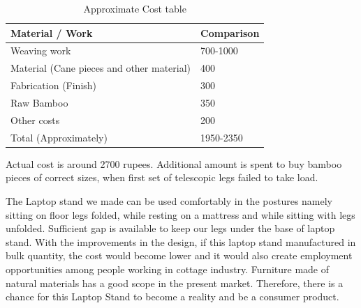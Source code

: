 \begin{table}[h!]
  \centering
  \caption{Approximate Cost table}
  \label{tab:table6}
  \begin{tabular}{l||l}
  	\hline
  	Material / Work & Comparison\\
    \hline    
	
Weaving work&
700-1000\\
Material (Cane pieces and other material)&
400\\
Fabrication (Finish)&
300\\
Raw Bamboo&
350\\
Other costs&
200\\
Total (Approximately)&
1950-2350\\

  \end{tabular}
\end{table}

Actual cost is around 2700 rupees. Additional amount is spent to buy bamboo pieces of correct sizes, when first set of telescopic legs failed to take load.


The Laptop stand we made can be used comfortably in the postures namely sitting on floor legs folded, while resting on a mattress and while sitting with legs unfolded. Sufficient gap is available to keep our legs under the base of laptop stand. With the improvements in the design, if this laptop stand manufactured in bulk quantity, the cost would become lower and it would also create employment opportunities among people working in cottage industry. Furniture made of natural materials has a good scope in the present market. Therefore, there is a chance for this Laptop Stand to become a reality and be a consumer product. 

\fi
